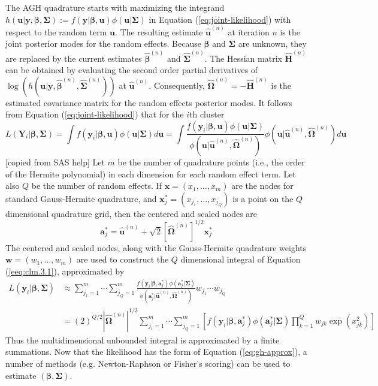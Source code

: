 The AGH quadrature starts with maximizing the integrand $h(\bm u|\bm y, \bm \beta, \bm \Sigma) :=
f(\bm y|\bm \beta, \bm u)\phi(\bm u|\bm \Sigma)$ in Equation (\ref{eq:joint-likelihood}) with
respect to the random term $\bm u$. The resulting estimate $\hat{\bm u}^{(n)}$ at iteration $n$ is
the joint posterior modes for the random effects. Because $\bm \beta$ and $\bm \Sigma$ are unknown,
they are replaced by the current estimates $\hat{\bm \beta}^{(n)}$ and $\hat{\bm \Sigma}^{(n)}$. The
Hessian matrix $\hat{\bm H}^{(n)}$ can be obtained by evaluating the second order partial
derivatives of $\log(h(\bm u|\bm y, \hat{\bm \beta}^{(n)}, \hat{\bm \Sigma}^{(n)}))$ at $\hat{\bm
	u}^{(n)}$. Consequently, $\hat{\bm \Omega}^{(n)} =-\hat{\bm H}^{(n)} $ is the estimated covariance
matrix for the random effects posterior modes. It follows from Equation (\ref{eq:joint-likelihood})
that for the $i$th cluster 
\begin{equation}\label{eeq:clm.3.1}
L( \bm Y_i|\bm \beta, \bm \Sigma) = \int f(\bm y_i|\bm \beta, \bm u )\phi(\bm u|\bm\Sigma)d\bm u =
\int \frac{f(\bm y_i|\bm \beta, \bm u )\phi(\bm u|\bm\Sigma)}{\phi(\bm u|\hat{\bm
		u}^{(n)},\hat{\bm \Omega}^{(n)} )}\phi(\bm u|\hat{\bm u}^{(n)},\hat{\bm \Omega}^{(n)} )d\bm u
\end{equation}
[copied from SAS help] Let $m$ be the number of quadrature points (i.e., the order of the Hermite
polynomial) in each dimension for each random effect term. Let also $Q$ be the number of random
effects. If $\bm x = (x_1, \ldots, x_m)$ are the nodes for standard Gauss-Hermite quadrature, and
$\bm x^{\ast}_j=(x_{j_1}, \ldots, x_{j_Q}) $ is a point on the $Q$ dimensional quadrature grid, then
the centered and scaled nodes are 
\begin{equation}\label{1.3.2}
\bm  a_j^{\ast} = \hat{\bm u}^{(n)} + \sqrt{2} [\hat{\bm \Omega}^{(n)} ]^{1/2}\bm x^{\ast}_j
\end{equation}
The centered and scaled nodes, along with the Gauss-Hermite quadrature weights $\bm w = (w_1,
\ldots, w_m)$ are used to construct the $Q$ dimensional integral of Equation (\ref{eeq:clm.3.1}),
approximated by 
\begin{equation}\label{eq:gh-approx}
\begin{aligned}
L(\bm y_i|\bm\beta, \bm \Sigma) &\approx\sum_{j_1=1}^m\cdots \sum_{j_Q=1}^m\frac{f(\bm y_i|\bm
	\beta, \bm  a_j^{\ast})\phi(\bm  a_j^{\ast}|\bm\Sigma)}{\phi(\bm  a_j^{\ast}|\hat{\bm
		u}^{(n)},\hat{\bm \Omega}^{(n)} )}w_{j_1}\cdots w_{j_Q}\\
& = (2)^{Q/2}|\hat{\bm \Omega}^{(n)}|^{1/2}\sum_{j_1=1}^m\cdots \sum_{j_Q=1}^m\left[ f(\bm y_i|\bm
\beta, \bm  a_j^{\ast} )\phi(\bm  a_j^{\ast}|\bm\Sigma) \prod_{k=1}^Qw_{jk}\exp(x_{jk}^2)\right]
\end{aligned}
\end{equation}
Thus the multidimensional unbounded integral is approximated by a finite summations. Now that the
likelihood has the form of Equation (\ref{eq:gh-approx}), a number of methods (e.g. Newton-Raphson
or Fisher's scoring) can be used to estimate $(\bm \beta,  \bm \Sigma)$. 

